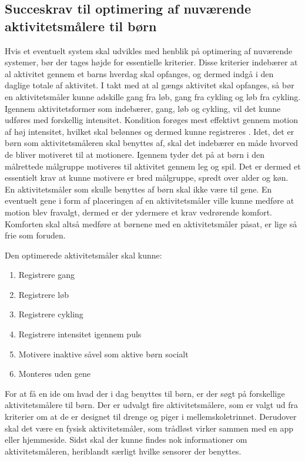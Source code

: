 \subsection{Succeskrav til optimering af nuværende aktivitetsmålere til børn}
Hvis et eventuelt system skal udvikles med henblik på optimering af nuværende systemer, bør der tages højde for essentielle kriterier. Disse kriterier indebærer at al aktivitet gennem et barns hverdag skal opfanges, og dermed indgå i den daglige totale af aktivitet. I takt med at al gængs aktivitet skal opfanges, så bør en aktivitetsmåler kunne adskille gang fra løb, gang fra cykling og løb fra cykling. Igennem aktivitetsformer som indebærer, gang, løb og cykling, vil det kunne udføres med forskellig intensitet. Kondition forøges mest effektivt gennem motion af høj intensitet, hvilket skal belønnes og dermed kunne registreres \citep{Hjerteforeningen}. Idet, det er børn som aktivitetsmåleren skal benyttes af, skal det indebærer en måde hvorved de bliver motiveret til at motionere. Igennem  tyder det på at børn i den målrettede målgruppe motiveres til aktivitet gennem leg og spil. Det er dermed et essentielt krav at kunne motivere er bred målgruppe, spredt over alder og køn. En aktivitetsmåler som skulle benyttes af børn skal ikke være til gene. En eventuelt gene i form af placeringen af en aktivitetsmåler ville kunne medføre at motion blev fravalgt, dermed er der ydermere et krav vedrørende komfort. Komforten skal altså medføre at børnene med en aktivitetsmåler påsat, er lige så frie som foruden.

Den optimerede aktivitetsmåler skal kunne: 
\begin{enumerate}
\item Registrere gang
\item Registrere løb
\item Registrere cykling
\item Registrere intensitet igennem puls
\item Motivere inaktive såvel som aktive børn socialt
\item Monteres uden gene
\end{enumerate}

For at få en ide om hvad der i dag benyttes til børn, er der søgt på forskellige aktivitetsmålere til børn. Der er udvalgt fire aktivitetsmålere, som er valgt ud fra kriterier om at de er designet til drenge og piger i mellemskoletrinnet. Derudover skal det være en fysisk aktivitetsmåler, som trådløst virker sammen med en app eller hjemmeside. Sidst skal der kunne findes nok informationer om aktivitetsmåleren, heriblandt særligt hvilke sensorer der benyttes.